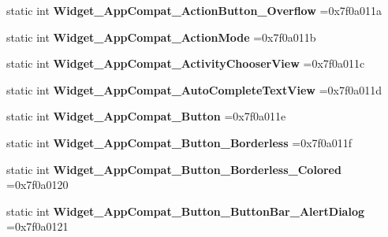\begin{DoxyCompactItemize}
static int {\bfseries Widget\+\_\+\+App\+Compat\+\_\+\+Action\+Button\+\_\+\+Overflow} =0x7f0a011a
\item 
\mbox{\label{classandroid_1_1support_1_1v4_1_1R_1_1style_a17d3b84307cec126ee556b71d5bd9135}} 
static int {\bfseries Widget\+\_\+\+App\+Compat\+\_\+\+Action\+Mode} =0x7f0a011b
\item 
\mbox{\label{classandroid_1_1support_1_1v4_1_1R_1_1style_abfd665f61ec700bf6068ba62e36337f0}} 
static int {\bfseries Widget\+\_\+\+App\+Compat\+\_\+\+Activity\+Chooser\+View} =0x7f0a011c
\item 
\mbox{\label{classandroid_1_1support_1_1v4_1_1R_1_1style_a88fbfd4c1d141a552ad4f6c99b0e2099}} 
static int {\bfseries Widget\+\_\+\+App\+Compat\+\_\+\+Auto\+Complete\+Text\+View} =0x7f0a011d
\item 
\mbox{\label{classandroid_1_1support_1_1v4_1_1R_1_1style_a3aff633eb42dd1d66127305291376c61}} 
static int {\bfseries Widget\+\_\+\+App\+Compat\+\_\+\+Button} =0x7f0a011e
\item 
\mbox{\label{classandroid_1_1support_1_1v4_1_1R_1_1style_adac64382df243f404d479b7f2eda5604}} 
static int {\bfseries Widget\+\_\+\+App\+Compat\+\_\+\+Button\+\_\+\+Borderless} =0x7f0a011f
\item 
\mbox{\label{classandroid_1_1support_1_1v4_1_1R_1_1style_abfdf6f63a70aac8807b7bbbead55a9c9}} 
static int {\bfseries Widget\+\_\+\+App\+Compat\+\_\+\+Button\+\_\+\+Borderless\+\_\+\+Colored} =0x7f0a0120
\item 
\mbox{\label{classandroid_1_1support_1_1v4_1_1R_1_1style_abe618148c352ae6368b55cd48a6510d1}} 
static int {\bfseries Widget\+\_\+\+App\+Compat\+\_\+\+Button\+\_\+\+Button\+Bar\+\_\+\+Alert\+Dialog} =0x7f0a0121
\item 
\mbox{\label{classandroid_1_1support_1_1v4_1_1R_1_1style_aefc9a6c220e9442b251f3d1a37374b37}} 

\end{DoxyCompactItemize}
